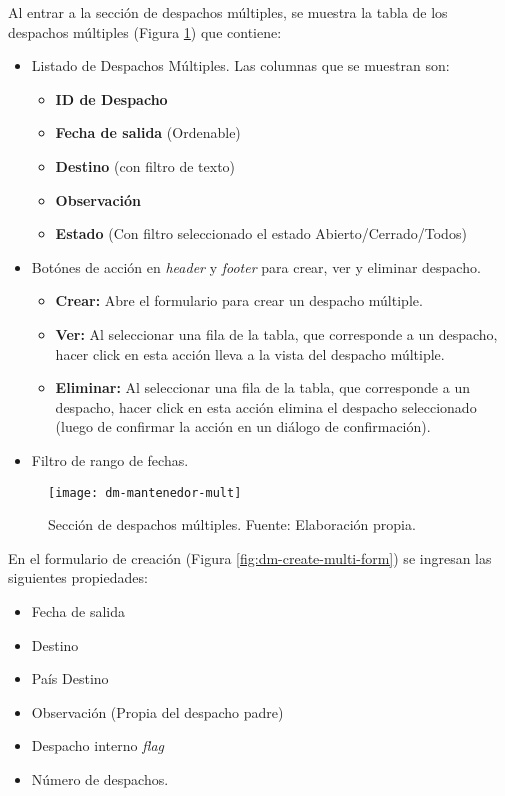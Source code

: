 Al entrar a la sección de despachos múltiples, se muestra la tabla de los despachos múltiples (Figura \ref{fig:dm-mantenedor-mult}) que contiene:
\begin{itemize}
    \item Listado de Despachos Múltiples. Las columnas que se muestran son:
    \begin{itemize}
        \item \textbf{ID de Despacho}
        \item \textbf{Fecha de salida} (Ordenable)
        \item \textbf{Destino} (con filtro de texto)
        \item \textbf{Observación}
        \item \textbf{Estado} (Con filtro seleccionado el estado Abierto/Cerrado/Todos)
    \end{itemize}
    \item Botónes de acción en \textit{header} y \textit{footer} para crear, ver y eliminar despacho.
    \begin{itemize}
        \item \textbf{Crear:} Abre el formulario para crear un despacho múltiple.
        \item \textbf{Ver:} Al seleccionar una fila de la tabla, que corresponde a un despacho, hacer click en esta acción lleva a la vista del despacho múltiple.
        \item \textbf{Eliminar:} Al seleccionar una fila de la tabla, que corresponde a un despacho, hacer click en esta acción elimina el despacho seleccionado (luego de confirmar la acción en un diálogo de confirmación).
    \end{itemize}
    \item Filtro de rango de fechas.
\end{itemize}

\begin{figure}[H]
	\centering
	\texttt{[image: dm-mantenedor-mult]}
	\caption{\label{fig:dm-mantenedor-mult} Sección de despachos múltiples. Fuente: Elaboración propia.}
\end{figure}

En el formulario de creación (Figura \ref{fig:dm-create-multi-form}) se ingresan las siguientes propiedades:
\begin{itemize}
    \item Fecha de salida
    \item Destino
    \item País Destino
    \item Observación (Propia del despacho padre)
    \item Despacho interno \textit{flag}    
    \item Número de despachos.
\end{itemize}

